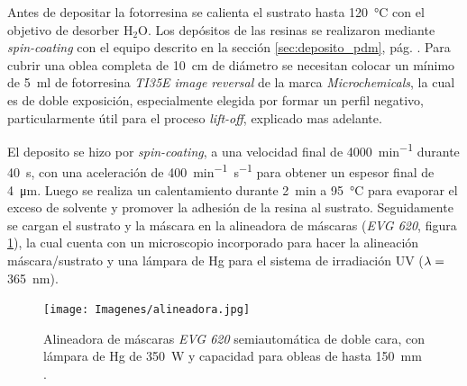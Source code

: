 		Antes de depositar la fotorresina se calienta el sustrato hasta \SI{120}{\celsius} con el objetivo de desorber H$_2$O. Los depósitos de las resinas se realizaron mediante \textit{spin-coating} con el equipo descrito en la sección \ref{sec:deposito_pdm}, pág. \pageref{sec:deposito_pdm}. Para cubrir una oblea completa de \SI{10}{\cm} de diámetro se necesitan colocar un mínimo de \SI{5}{\ml} de fotorresina \textit{TI35E image reversal} de la marca \textit{Microchemicals}, la cual es de doble exposición, especialmente elegida por formar un perfil negativo, particularmente útil para el proceso \textit{lift-off}, explicado mas adelante.\cite{MicrochemicalsTeam2009} 
	
		El deposito se hizo por \textit{spin-coating}, a una velocidad final de \SI{4000}{\minute^{-1}} durante \SI{40}{\second}, con una aceleración de \SI{400}{\minute^{-1}.\second^{-1}} para obtener un espesor final de \SI{4}{\um}. Luego se realiza un calentamiento durante \SI{2}{\minute} a \SI{95}{\celsius} para evaporar el exceso de solvente y promover la adhesión de la resina al sustrato. Seguidamente se cargan el sustrato y la máscara en la alineadora de máscaras (\textit{EVG 620}, figura \ref{fig:alineadora}), la cual cuenta con un microscopio incorporado para hacer la alineación máscara/sustrato y una lámpara de Hg para el sistema de irradiación UV ($\lambda\index{longitud de onda}=$\SI{365}{\nm}). 
			\begin{figure}[b!]
			  \begin{center}
			  \vspace*{-0.4cm}%
			  \texttt{[image: Imagenes/alineadora.jpg]}
			  \caption[Alineadora de máscaras]{Alineadora de máscaras \textit{EVG 620} semiautomática de doble cara, con lámpara de Hg de \SI{350}{W}  y capacidad para obleas de hasta \SI{150}{\mm} .}
			  \label{fig:alineadora}
			  \end{center}
			  \end{figure}	
			
